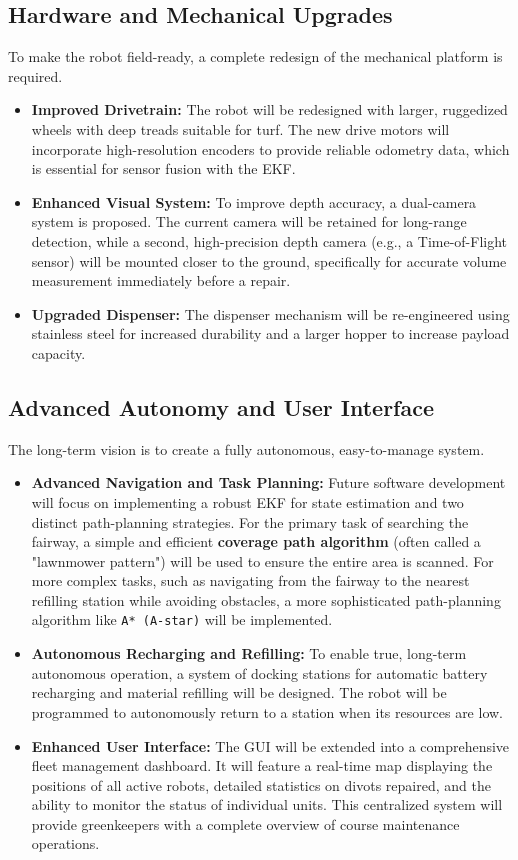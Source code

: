 \subsection{Hardware and Mechanical Upgrades}
To make the robot field-ready, a complete redesign of the mechanical platform is required.
\begin{itemize}
    \item \textbf{Improved Drivetrain:} The robot will be redesigned with larger, ruggedized wheels with deep treads suitable for turf. The new drive motors will incorporate high-resolution encoders to provide reliable odometry data, which is essential for sensor fusion with the EKF.
    \item \textbf{Enhanced Visual System:} To improve depth accuracy, a dual-camera system is proposed. The current camera will be retained for long-range detection, while a second, high-precision depth camera (e.g., a Time-of-Flight sensor) will be mounted closer to the ground, specifically for accurate volume measurement immediately before a repair.
    \item \textbf{Upgraded Dispenser:} The dispenser mechanism will be re-engineered using stainless steel for increased durability and a larger hopper to increase payload capacity. 
\end{itemize}

\subsection{Advanced Autonomy and User Interface}
The long-term vision is to create a fully autonomous, easy-to-manage system.
\begin{itemize}
    \item \textbf{Advanced Navigation and Task Planning:} Future software development will focus on implementing a robust EKF for state estimation and two distinct path-planning strategies. For the primary task of searching the fairway, a simple and efficient \textbf{coverage path algorithm} (often called a "lawnmower pattern") will be used to ensure the entire area is scanned. For more complex tasks, such as navigating from the fairway to the nearest refilling station while avoiding obstacles, a more sophisticated path-planning algorithm like \texttt{A* (A-star)} will be implemented.
    \item \textbf{Autonomous Recharging and Refilling:} To enable true, long-term autonomous operation, a system of docking stations for automatic battery recharging and material refilling will be designed. The robot will be programmed to autonomously return to a station when its resources are low.
    \item \textbf{Enhanced User Interface:} The GUI will be extended into a comprehensive fleet management dashboard. It will feature a real-time map displaying the positions of all active robots, detailed statistics on divots repaired, and the ability to monitor the status of individual units. This centralized system will provide greenkeepers with a complete overview of course maintenance operations.
\end{itemize}

